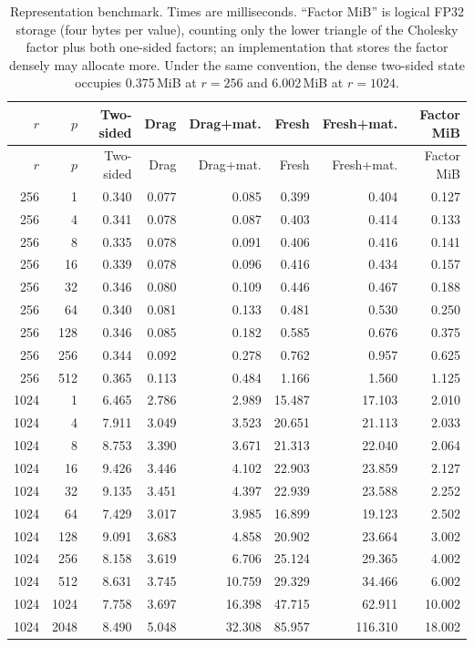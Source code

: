 \documentclass[11pt]{article}
\begin{document}
\begin{landscape}
\scriptsize
\begin{longtable}{@{}rrrrrrrr@{}}
\caption{Representation benchmark.  Times are milliseconds.  ``Factor MiB''
is logical FP32 storage (four bytes per value), counting only the lower
triangle of the Cholesky factor plus both one-sided factors; an implementation
that stores the factor densely may allocate more.  Under the same convention,
the dense two-sided state occupies 0.375\,MiB at \(r=256\) and 6.002\,MiB at
\(r=1024\).}
\label{tab:e3-full}\\
\toprule
\(r\) & \(p\) & Two-sided & Drag & Drag+mat. & Fresh & Fresh+mat. &
Factor MiB \\
\midrule
\endfirsthead
\toprule
\(r\) & \(p\) & Two-sided & Drag & Drag+mat. & Fresh & Fresh+mat. &
Factor MiB \\
\midrule
\endhead
256 & 1   & 0.340 & 0.077 & 0.085 & 0.399 & 0.404 & 0.127 \\
256 & 4   & 0.341 & 0.078 & 0.087 & 0.403 & 0.414 & 0.133 \\
256 & 8   & 0.335 & 0.078 & 0.091 & 0.406 & 0.416 & 0.141 \\
256 & 16  & 0.339 & 0.078 & 0.096 & 0.416 & 0.434 & 0.157 \\
256 & 32  & 0.346 & 0.080 & 0.109 & 0.446 & 0.467 & 0.188 \\
256 & 64  & 0.340 & 0.081 & 0.133 & 0.481 & 0.530 & 0.250 \\
256 & 128 & 0.346 & 0.085 & 0.182 & 0.585 & 0.676 & 0.375 \\
256 & 256 & 0.344 & 0.092 & 0.278 & 0.762 & 0.957 & 0.625 \\
256 & 512 & 0.365 & 0.113 & 0.484 & 1.166 & 1.560 & 1.125 \\
\midrule
1024 & 1    & 6.465 & 2.786 & 2.989 & 15.487 & 17.103 & 2.010 \\
1024 & 4    & 7.911 & 3.049 & 3.523 & 20.651 & 21.113 & 2.033 \\
1024 & 8    & 8.753 & 3.390 & 3.671 & 21.313 & 22.040 & 2.064 \\
1024 & 16   & 9.426 & 3.446 & 4.102 & 22.903 & 23.859 & 2.127 \\
1024 & 32   & 9.135 & 3.451 & 4.397 & 22.939 & 23.588 & 2.252 \\
1024 & 64   & 7.429 & 3.017 & 3.985 & 16.899 & 19.123 & 2.502 \\
1024 & 128  & 9.091 & 3.683 & 4.858 & 20.902 & 23.664 & 3.002 \\
1024 & 256  & 8.158 & 3.619 & 6.706 & 25.124 & 29.365 & 4.002 \\
1024 & 512  & 8.631 & 3.745 & 10.759 & 29.329 & 34.466 & 6.002 \\
1024 & 1024 & 7.758 & 3.697 & 16.398 & 47.715 & 62.911 & 10.002 \\
1024 & 2048 & 8.490 & 5.048 & 32.308 & 85.957 & 116.310 & 18.002 \\
\bottomrule
\end{longtable}
\end{landscape}
\end{document}
